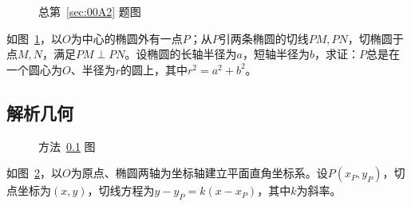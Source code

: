 

\begin{figure}[htbp]
  \centering
  \caption{总第~\ref{sec:00A2} 题图} \label{fig:00A2}
\end{figure}

如图~\ref{fig:00A2}，以$O$为中心的椭圆外有一点$P$；从$P$引两条椭圆的切线$PM, PN$，切椭圆于点$M, N$，满足$PM \perp PN$。设椭圆的长轴半径为$a$，短轴半径为$b$，求证：$P$总是在一个圆心为$O$、半径为$r$的圆上，其中$r^2 = a^2 + b^2$。

\subsection{解析几何} \label{subsec:00A2-dec}

\begin{figure}[htbp]
  \centering
  \caption{方法~\ref{subsec:00A2-dec} 图} \label{fig:00A2-dec}
\end{figure}

如图~\ref{fig:00A2-dec}，以$O$为原点、椭圆两轴为坐标轴建立平面直角坐标系。设$P(x_P, y_P)$，切点坐标为$(x, y)$，切线方程为$y - y_P = k(x - x_P)$，其中$k$为斜率。

